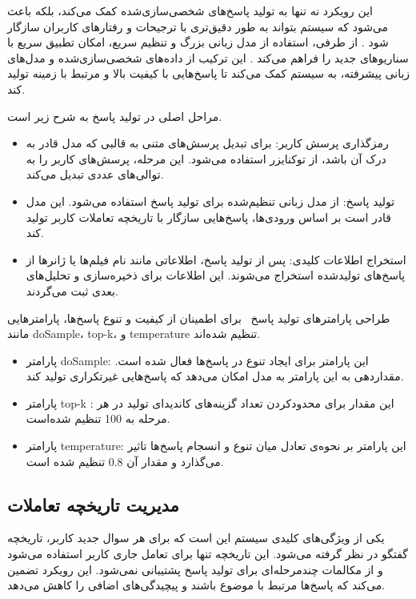 \begin{enumerate}
این رویکرد نه تنها به تولید پاسخ‌های شخصی‌سازی‌شده کمک می‌کند، بلکه باعث می‌شود که سیستم بتواند به طور دقیق‌تری با ترجیحات و رفتارهای کاربران سازگار شود . از طرفی، استفاده از مدل زبانی بزرگ و تنظیم سریع، امکان تطبیق سریع با سناریوهای جدید را فراهم می‌کند . این ترکیب از داده‌های شخصی‌سازی‌شده و مدل‌های زبانی پیشرفته، به سیستم کمک می‌کند تا پاسخ‌هایی با کیفیت بالا و مرتبط با زمینه تولید کند.


مراحل اصلی در تولید پاسخ به شرح زیر است.
\begin{itemize}
\item
رمزگذاری پرسش کاربر: برای تبدیل پرسش‌های متنی به قالبی که مدل قادر به درک آن باشد، از توکنایزر استفاده می‌شود. این مرحله، پرسش‌های کاربر را به توالی‌های عددی تبدیل می‌کند.
\item
تولید پاسخ: از مدل زبانی تنظیم‌شده برای تولید پاسخ استفاده می‌شود. این مدل قادر است بر اساس ورودی‌ها، پاسخ‌هایی سازگار با تاریخچه تعاملات کاربر تولید کند.
\item
استخراج اطلاعات کلیدی: پس از تولید پاسخ، اطلاعاتی مانند نام فیلم‌ها یا ژانرها از پاسخ‌های تولیدشده استخراج می‌شوند. این اطلاعات برای ذخیره‌سازی و تحلیل‌های بعدی ثبت می‌گردند.
\end{itemize}


طراحی پارامترهای تولید پاسخ
\
برای اطمینان از کیفیت و تنوع پاسخ‌ها، پارامترهایی مانند doSample، top-k، و temperature تنظیم شده‌اند.
\begin{itemize}
\item
پارامتر doSample: این پارامتر برای ایجاد تنوع در پاسخ‌ها فعال شده‌ است. مقداردهی به این پارامتر به مدل امکان می‌دهد که پاسخ‌هایی غیرتکراری تولید کند.
\item
پارامتر top-k : این مقدار برای محدود‌کردن تعداد گزینه‌های کاندیدای تولید در هر مرحله به 100 تنظیم شده‌است.
\item
پارامتر temperature: این پارامتر بر نحوه‌ی تعادل میان تنوع و انسجام پاسخ‌ها تاثیر می‌گذارد و مقدار آن 
\num{0.8}
 تنظیم شده است.
\end{itemize}


\subsection{مدیریت تاریخچه تعاملات}

یکی از ویژگی‌های کلیدی سیستم این است که برای هر سوال جدید کاربر، تاریخچه گفتگو در نظر گرفته می‌شود. این تاریخچه تنها برای تعامل جاری کاربر استفاده می‌شود و از مکالمات چندمرحله‌ای برای تولید پاسخ پشتیبانی نمی‌شود. این رویکرد تضمین می‌کند که پاسخ‌ها مرتبط با موضوع باشند و پیچیدگی‌های اضافی را کاهش می‌دهد.



\end{enumerate}
